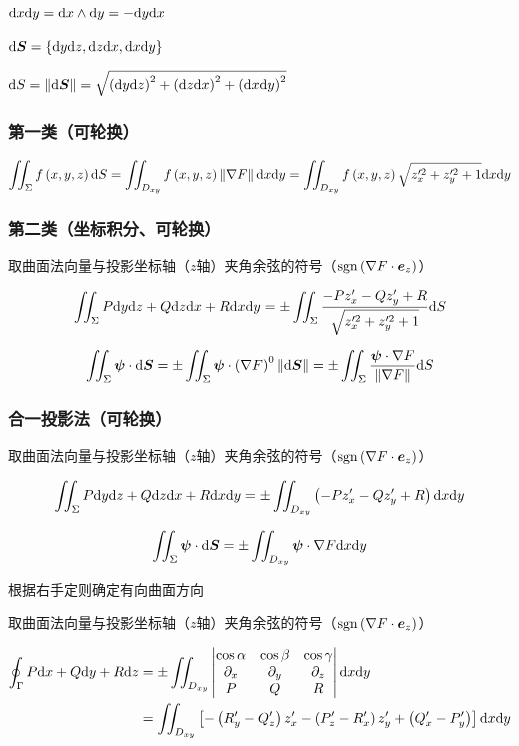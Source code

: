 \documentclass{article}
\begin{document}
$\mathrm d x\mathrm d y=\mathrm d x\wedge\mathrm d y=-\mathrm d y\mathrm d x$

$\mathrm d\boldsymbol S=\left\{\mathrm d y\mathrm d z,\mathrm d z\mathrm d x,\mathrm d x\mathrm d y\right\}$

$\mathrm d S=\left\Vert\mathrm d\boldsymbol S\right\Vert=\sqrt{\left(\mathrm d y\mathrm d z\right)^2+\left(\mathrm d z\mathrm d x\right)^2+\left(\mathrm d x\mathrm d y\right)^2}$

\subsubsection{第一类（可轮换）}

\[\iint_\Sigma f\left(x,y,z\right)\mathrm d S=
    \iint_{D_{xy}}f\left(x,y,z\right)\left\Vert\nabla F\right\Vert\mathrm d x\mathrm d y=
    \iint_{D_{xy}}f\left(x,y,z\right)\sqrt{z_x^{\prime 2}+z_y^{\prime 2}+1}\mathrm d x\mathrm d y\]

\subsubsection{第二类（坐标积分、可轮换）}

取曲面法向量与投影坐标轴（$z$轴）夹角余弦的符号（$\mathrm{sgn}\left(\nabla F\cdot \boldsymbol e_z\right)$）

\[\iint_\Sigma P\mathrm d y\mathrm d z+Q\mathrm d z\mathrm d x+R\mathrm d x\mathrm d y=
    \pm\iint_\Sigma\frac{-Pz_x^\prime-Qz_y^\prime+R}{\sqrt{z_x^{\prime2}+z_y^{\prime2}+1}}\mathrm d S\]

\[\iint_\Sigma\boldsymbol\psi\cdot\mathrm d\boldsymbol S=
    \pm\iint_\Sigma\boldsymbol\psi\cdot\left(\nabla F\right)^0\left\Vert\mathrm d\boldsymbol S\right\Vert=
    \pm\iint_\Sigma\frac{\boldsymbol\psi\cdot\nabla F}{\left\Vert\nabla F\right\Vert}\mathrm d S\]

\subsubsection{合一投影法（可轮换）}

取曲面法向量与投影坐标轴（$z$轴）夹角余弦的符号（$\mathrm{sgn}\left(\nabla F\cdot \boldsymbol{e}_z\right)$）

\[\iint_\Sigma P\mathrm d y\mathrm d z+Q\mathrm d z\mathrm d x+R\mathrm d x\mathrm d y=
    \pm\iint_{D_{xy}}\left(-Pz_x^\prime-Qz_y^\prime+R\right)\mathrm d x\mathrm d y\]

\[\iint_\Sigma\boldsymbol\psi\cdot\mathrm d\boldsymbol S
    =\pm\iint_{D_{xy}}\boldsymbol\psi\cdot\nabla F\mathrm d x\mathrm d y\]

根据右手定则确定有向曲面方向


取曲面法向量与投影坐标轴（$z$轴）夹角余弦的符号（$\mathrm{sgn}\left(\nabla F\cdot \boldsymbol{e}_z\right)$）

\[\begin{aligned}
        \oint_\Gamma P\mathrm d x+Q\mathrm d y+R\mathrm d z
         & =\pm\iint_{D_{xy}}\begin{vmatrix}
                                 \cos\alpha & \cos\beta  & \cos\gamma \\
                                 \partial_x & \partial_y & \partial_z \\
                                 P          & Q          & R
                             \end{vmatrix}\mathrm d x\mathrm d y \\
         & =\iint_{D_{xy}}
        \left[-\left(R_y^\prime-Q_z^\prime\right)z_x^\prime
            -\left(P_z^\prime-R_x^\prime\right)z_y^\prime
            +\left(Q_x^\prime-P_y^\prime\right)\right]\mathrm d x\mathrm d y
    \end{aligned}\]
\end{document}
